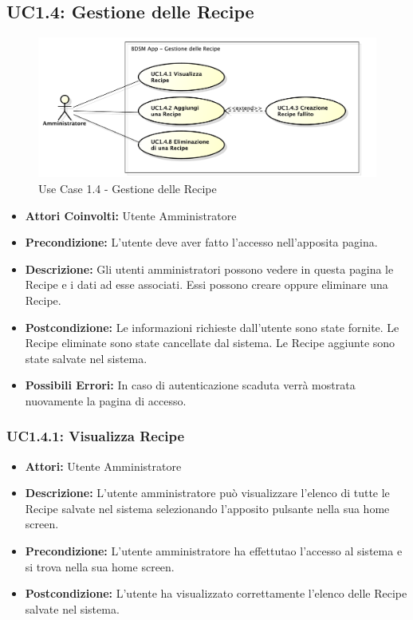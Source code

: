 \clearpage


\subsection{UC1.4: Gestione delle Recipe}

\begin{figure}[!ht]
    \centering
    \centerline{\includegraphics[scale=0.5]{./images/UC1_4.pdf}}
    \caption{Use Case 1.4 - Gestione delle Recipe}
\end{figure}

\begin{itemize}
    \item \textbf{Attori Coinvolti:} Utente Amministratore

    \item \textbf{Precondizione:} L'utente deve aver fatto l'accesso nell'apposita pagina.

    \item \textbf{Descrizione:} Gli utenti amministratori possono vedere in questa pagina le Recipe e i dati ad esse associati. Essi possono creare oppure eliminare una Recipe.

    \item \textbf{Postcondizione:} Le informazioni richieste dall'utente sono state fornite.
    Le Recipe eliminate sono state cancellate dal sistema.
    Le Recipe aggiunte sono state salvate nel sistema.

    \item \textbf{Possibili Errori:} In caso di autenticazione scaduta verrà mostrata nuovamente la pagina di accesso.
\end{itemize}

\subsubsection{UC1.4.1: Visualizza Recipe}

\begin{itemize}
    \item \textbf{Attori:} Utente Amministratore
    \item \textbf{Descrizione:} L'utente amministratore può visualizzare l'elenco di tutte le Recipe salvate nel sistema selezionando l'apposito pulsante nella sua home screen.
    \item \textbf{Precondizione:} L'utente amministratore ha effettutao l'accesso al sistema e si trova nella sua home screen.
    \item \textbf{Postcondizione:} L'utente ha visualizzato correttamente l'elenco delle Recipe salvate nel sistema.
\end{itemize}

